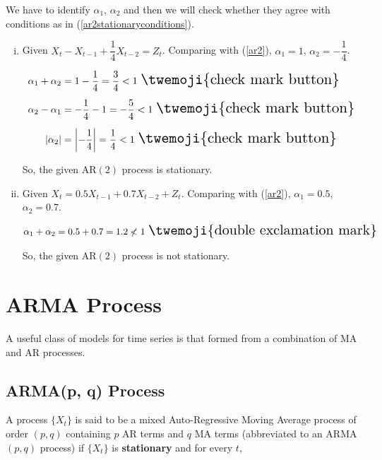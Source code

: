 \documentclass[11pt, a4paper]{article}
\numberwithin{equation}{section}
\theoremstyle{definition}
\begin{document}
\bccrayon \hspace{0.1cm} We have to identify $\alpha_1$, $\alpha_2$ and then we will check whether they agree with conditions as in (\ref{ar2stationaryconditions}).
\begin{enumerate}[(i)]
\item Given $X_t - X_{t-1} + \dfrac{1}{4} X_{t-2} = Z_t$. Comparing with (\ref{ar2}), $\alpha_1 = 1$, $\alpha_2 = - \dfrac{1}{4}$.

\begin{align*}
\alpha_1 + \alpha_2 &= 1 - \dfrac{1}{4} = \dfrac{3}{4} < 1 \,\, \scalebox{1.5}{\twemoji{check mark button}} \\[0.5em]
\alpha_2 - \alpha_1 &= - \dfrac{1}{4} - 1 = - \dfrac{5}{4} < 1 \,\, \scalebox{1.5}{\twemoji{check mark button}} \\[0.5em]
|\alpha_2| &= \left|-\dfrac{1}{4}\right| = \dfrac{1}{4} < 1 \,\, \scalebox{1.5}{\twemoji{check mark button}}
\end{align*}

So, the given AR$(2)$ process is stationary.

\item Given $X_t = 0.5 X_{t-1} + 0.7 X_{t-2} + Z_t$. Comparing with (\ref{ar2}), $\alpha_1 = 0.5$, $\alpha_2 = 0.7$.

\begin{align*}
\alpha_1 + \alpha_2 = 0.5 + 0.7 = 1.2 \nless 1 \,\, \scalebox{1.5}{\twemoji{double exclamation mark}} 
\end{align*}

So, the given AR$(2)$ process is not stationary.

\end{enumerate}

\newpage

\section{ARMA Process}

A useful class of models for time series is that formed from a combination of MA and AR processes. \\[0.5em]

\subsection{ARMA(p, q) Process}
A process $\{X_t\}$ is said to be a mixed Auto-Regressive Moving Average process of order $(p, q)$ containing $p$ AR terms and $q$ MA terms (abbreviated to an ARMA $(p,q)$ process) if $\{X_t\}$ is \textbf{stationary} and for every $t$,
\end{document}
